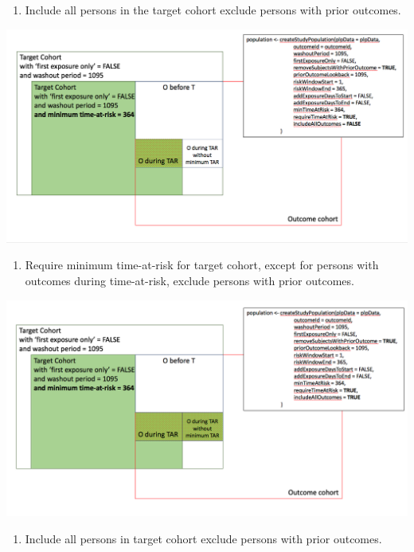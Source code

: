 \documentclass[]{book}
\providecommand{\tightlist}{%
  \setlength{\itemsep}{0pt}\setlength{\parskip}{0pt}}
\begin{document}
\newpage

\begin{enumerate}
\def\labelenumi{\arabic{enumi}.}
\setcounter{enumi}{2}
\tightlist
\item
  Include all persons in the target cohort exclude persons with prior
  outcomes.
\end{enumerate}

\includegraphics[width=1\linewidth]{images/PatientLevelPrediction/popdef3}

\begin{enumerate}
\def\labelenumi{\arabic{enumi}.}
\setcounter{enumi}{3}
\tightlist
\item
  Require minimum time-at-risk for target cohort, except for persons
  with outcomes during time-at-risk, exclude persons with prior
  outcomes.
\end{enumerate}

\includegraphics[width=1\linewidth]{images/PatientLevelPrediction/popdef4}

\newpage

\begin{enumerate}
\def\labelenumi{\arabic{enumi}.}
\setcounter{enumi}{4}
\tightlist
\item
  Include all persons in target cohort exclude persons with prior
  outcomes.
\end{enumerate}
\end{document}
